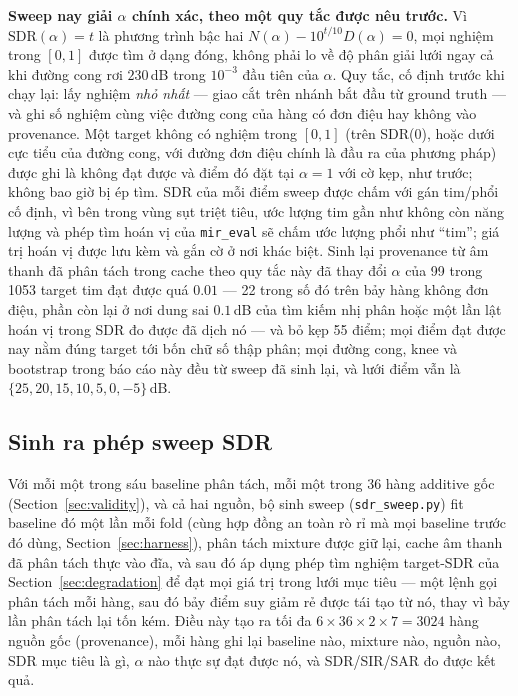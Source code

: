\documentclass[11pt]{article}
\begin{document}
\textbf{Sweep nay giải $\alpha$ chính xác, theo một quy tắc được nêu
trước.} Vì $\text{SDR}(\alpha) = t$ là phương trình bậc hai
$N(\alpha) - 10^{t/10} D(\alpha) = 0$, mọi nghiệm trong $[0,1]$ được tìm
ở dạng đóng, không phải lo về độ phân giải lưới ngay cả khi đường cong
rơi $230$\,dB trong $10^{-3}$ đầu tiên của $\alpha$. Quy tắc, cố định
trước khi chạy lại: lấy nghiệm \emph{nhỏ nhất} --- giao cắt trên nhánh
bắt đầu từ ground truth --- và ghi số nghiệm cùng việc đường cong của
hàng có đơn điệu hay không vào provenance. Một target không có nghiệm
trong $[0,1]$ (trên SDR(0), hoặc dưới cực tiểu của đường cong, với đường
đơn điệu chính là đầu ra của phương pháp) được ghi là không đạt được và
điểm đó đặt tại $\alpha{=}1$ với cờ kẹp, như trước; không bao giờ bị ép
tìm. SDR của mỗi điểm sweep được chấm với gán tim/phổi cố định, vì bên
trong vùng sụt triệt tiêu, ước lượng tim gần như không còn năng lượng và
phép tìm hoán vị của \texttt{mir\_eval} sẽ chấm ước lượng phổi như
``tim''; giá trị hoán vị được lưu kèm và gắn cờ ở nơi khác biệt. Sinh lại
provenance từ âm thanh đã phân tách trong cache theo quy tắc này đã thay
đổi $\alpha$ của 99 trong 1053 target tim đạt được quá $0.01$ --- 22 trong
số đó trên bảy hàng không đơn điệu, phần còn lại ở nơi dung sai $0.1$\,dB
của tìm kiếm nhị phân hoặc một lần lật hoán vị trong SDR đo được đã dịch
nó --- và bỏ kẹp 55 điểm; mọi điểm đạt được nay nằm đúng target tới bốn
chữ số thập phân; mọi đường cong, knee và
bootstrap trong báo cáo này đều từ sweep đã sinh lại, và lưới điểm vẫn là
$\{25, 20, 15, 10, 5, 0, -5\}$\,dB.

\subsection{Sinh ra phép sweep SDR}
\label{sec:sweepgen}

Với mỗi một trong sáu baseline phân tách, mỗi một trong 36 hàng additive
gốc (Section~\ref{sec:validity}), và cả hai nguồn, bộ sinh sweep
(\texttt{sdr\_sweep.py}) fit baseline đó một lần mỗi fold (cùng hợp đồng
an toàn rò rỉ mà mọi baseline trước đó dùng, Section~\ref{sec:harness}),
phân tách mixture được giữ lại, cache âm thanh đã phân tách thực vào đĩa,
và sau đó áp dụng phép tìm nghiệm target-SDR của Section~\ref{sec:degradation}
để đạt mọi giá trị trong lưới mục tiêu --- một lệnh gọi phân tách mỗi
hàng, sau đó bảy điểm suy giảm rẻ được tái tạo từ nó, thay vì bảy lần
phân tách lại tốn kém. Điều này tạo ra tối đa
$6 \times 36 \times 2 \times 7 = 3024$ hàng nguồn gốc (provenance), mỗi
hàng ghi lại baseline nào, mixture nào, nguồn nào, SDR mục tiêu là gì,
$\alpha$ nào thực sự đạt được nó, và SDR/SIR/SAR đo được kết quả.
\end{document}
